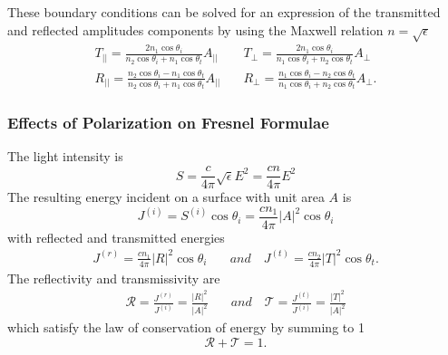 These boundary conditions can be solved for an expression of the transmitted and reflected amplitudes components by using the Maxwell relation $n = \sqrt{\epsilon}$
%
\begin{align}
    T_{||} = \frac{2 n_1 \cos{\theta_i}}{n_2 \cos{\theta_i} + n_1 \cos{\theta_t}} A_{||} \quad &
    T_{\perp} = \frac{2 n_1 \cos{\theta_i}}{n_1 \cos{\theta_i} + n_2 \cos{\theta_t}} A_{\perp} \\
    R_{||} = \frac{n_2 \cos{\theta_i} - n_1 \cos{\theta_t}}{n_2 \cos{\theta_i} + n_1 \cos{\theta_t}} A_{||} \quad &
    R_{\perp} = \frac{n_1 \cos{\theta_i} - n_2 \cos{\theta_t}}{n_1 \cos{\theta_i} + n_2 \cos{\theta_t}} A_{\perp}.
\end{align}

\subsubsection{Effects of Polarization on Fresnel Formulae}

The light intensity is
%
\begin{equation}
    S = \frac{c}{4\pi} \sqrt{\epsilon} E^2 = \frac{cn}{4\pi} E^2
\end{equation}
%
The resulting energy incident on a surface with unit area $A$ is
%
\begin{equation}
    J^{(i)} = S^{(i)} \cos{\theta_i} = \frac{cn_1}{4\pi} |A|^2 \cos{\theta_i}
\end{equation}
%
with reflected and transmitted energies
%
\begin{align}
    J^{(r)} = \frac{cn_1}{4\pi} |R|^2 \cos{\theta_i} & \quad and \quad J^{(t)} = \frac{cn_2}{4\pi} |T|^2 \cos{\theta_t}.
\end{align}
%
The reflectivity and transmissivity are
%
\begin{align}
    \mathcal{R} = \frac{J^{(r)}}{J^{(i)}} = \frac{|R|^2}{|A|^2} & \quad and \quad \mathcal{T} = \frac{J^{(t)}}{J^{(i)}} = \frac{|T|^2}{|A|^2}
\end{align}
%
which satisfy the law of conservation of energy by summing to 1
%
\begin{equation}
    \mathcal{R} + \mathcal{T} = 1.
\end{equation}

